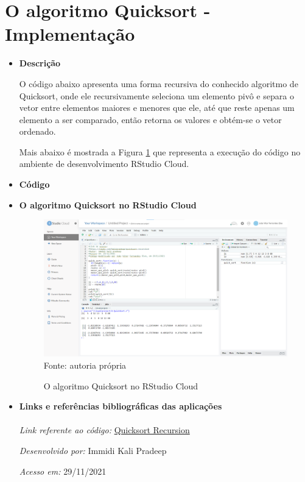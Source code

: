   \section{O algoritmo Quicksort - Implementação}
  \begin{itemize}
  	\item \textbf{Descrição}
  	  
  	  O código abaixo apresenta uma forma recursiva do conhecido algoritmo de Quicksort, onde ele recursivamente seleciona um elemento pivô e separa o vetor entre elementos maiores e menores que ele, até que reste apenas um elemento a ser comparado, então retorna os valores e obtém-se o vetor ordenado.
  	
  	  Mais abaixo é mostrada a Figura \ref{Codigo_4} que representa a execução do código no ambiente de desenvolvimento RStudio Cloud.
  	
  	\item \textbf{Código}
  	
  	\color{blue}
  	
  	\color{black}
  	
  	\item \textbf{O algoritmo Quicksort no RStudio Cloud}
  	
      \begin{figure}[H]  \label{Codigo_4}
        \centering
        \caption{O algoritmo Quicksort no RStudio Cloud}
        \includegraphics[width=16cm]{PicturesJoaoDias/Codigos/Codigo4_cloud.png}
        {\tiny \sf Fonte: autoria própria}
      \end{figure}
  	
  	\item \textbf{Links e referências bibliográficas das aplicações}
  	\\ \\
  	\textit{Link referente ao código:} 
  	\href{https://rpubs.com/kalipradeep/quicksort-recursion}{Quicksort Recursion}
  	
  	\textit{Desenvolvido por:} Immidi Kali Pradeep
  	
  	\textit{Acesso em:} 29/11/2021
  	
  \end{itemize}
	
